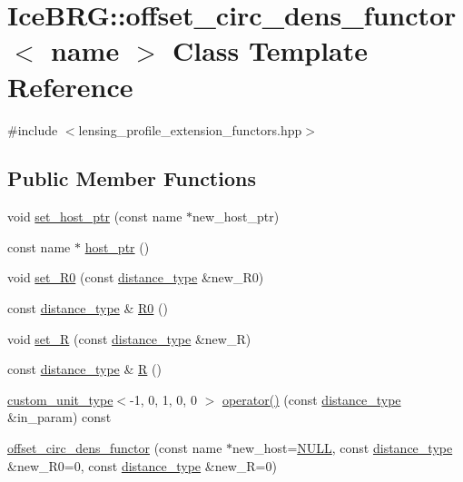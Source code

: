 \hypertarget{classIceBRG_1_1offset__circ__dens__functor}{}\section{Ice\+B\+R\+G\+:\+:offset\+\_\+circ\+\_\+dens\+\_\+functor$<$ name $>$ Class Template Reference}
\label{classIceBRG_1_1offset__circ__dens__functor}


{\ttfamily \#include $<$lensing\+\_\+profile\+\_\+extension\+\_\+functors.\+hpp$>$}

\subsection*{Public Member Functions}
\begin{DoxyCompactItemize}
\item 
void \hyperlink{classIceBRG_1_1offset__circ__dens__functor_ad3482bde1a5e93af9f0c735a826d58a8}{set\+\_\+host\+\_\+ptr} (const name $\ast$new\+\_\+host\+\_\+ptr)
\item 
const name $\ast$ \hyperlink{classIceBRG_1_1offset__circ__dens__functor_a88cdff42c46c90342f06d0ffca4a9ba2}{host\+\_\+ptr} ()
\item 
void \hyperlink{classIceBRG_1_1offset__circ__dens__functor_ab411bc3a5f90438879f244f3843fd068}{set\+\_\+\+R0} (const \hyperlink{namespaceIceBRG_a45499647eb87e24c10ab32c628711cec}{distance\+\_\+type} \&new\+\_\+\+R0)
\item 
const \hyperlink{namespaceIceBRG_a45499647eb87e24c10ab32c628711cec}{distance\+\_\+type} \& \hyperlink{classIceBRG_1_1offset__circ__dens__functor_a5c12b0eb12bdfdf95eac9d20fac98f7c}{R0} ()
\item 
void \hyperlink{classIceBRG_1_1offset__circ__dens__functor_a761a4a76394476f484953ebac9c5c748}{set\+\_\+\+R} (const \hyperlink{namespaceIceBRG_a45499647eb87e24c10ab32c628711cec}{distance\+\_\+type} \&new\+\_\+\+R)
\item 
const \hyperlink{namespaceIceBRG_a45499647eb87e24c10ab32c628711cec}{distance\+\_\+type} \& \hyperlink{classIceBRG_1_1offset__circ__dens__functor_a2b76922c77ba42400bc8e82bcc94e3be}{R} ()
\item 
\hyperlink{namespaceIceBRG_a896bc1bf7e8db5ca045b9cf35912ca5e}{custom\+\_\+unit\+\_\+type}$<$-\/1, 0, 1, 0, 0 $>$ \hyperlink{classIceBRG_1_1offset__circ__dens__functor_a8b9fda572534c46cbe33851d775100f0}{operator()} (const \hyperlink{namespaceIceBRG_a45499647eb87e24c10ab32c628711cec}{distance\+\_\+type} \&in\+\_\+param) const 
\item 
\hyperlink{classIceBRG_1_1offset__circ__dens__functor_a4cd1ff81a3ca4d67f8b1fc8bd4a670f7}{offset\+\_\+circ\+\_\+dens\+\_\+functor} (const name $\ast$new\+\_\+host=\hyperlink{lib_2IceBRG__main_2common_8h_a070d2ce7b6bb7e5c05602aa8c308d0c4}{N\+U\+L\+L}, const \hyperlink{namespaceIceBRG_a45499647eb87e24c10ab32c628711cec}{distance\+\_\+type} \&new\+\_\+\+R0=0, const \hyperlink{namespaceIceBRG_a45499647eb87e24c10ab32c628711cec}{distance\+\_\+type} \&new\+\_\+\+R=0)
\end{DoxyCompactItemize}


